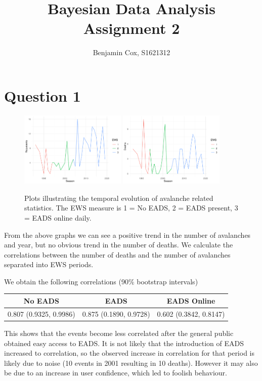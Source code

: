 \documentclass[10pt]{extarticle}
\begin{document}
	
\title{Bayesian Data Analysis Assignment 2}
\author{Benjamin Cox, S1621312}
\date{\vspace{-5ex}}
\maketitle

\section*{Question 1}

\begin{figure}[H]
	\includegraphics[width = 0.45\textwidth]{../ava_sea}
	\includegraphics[width = 0.45\textwidth]{../dea_sea}
	\caption{Plots illustrating the temporal evolution of avalanche related statistics. The EWS measure is 1 = No EADS, 2 = EADS present, 3 = EADS online daily.}
	\label{fig:tempevava}
\end{figure}	

	From the above graphs we can see a positive trend in the number of avalanches and year, but no obvious trend in the number of deaths. We calculate the correlations between the number of deaths and the number of avalanches separated into EWS periods. 
	
	We obtain the following correlations (90\% bootstrap intervals)
\begin{table}[H]
	\centering
	\begin{tabular}{ccc}
		\hline
		No EADS & EADS & EADS Online \\
		\hline
		0.807 (0.9325, 0.9986) & 0.875 (0.1890, 0.9728) & 0.602 (0.3842, 0.8147) \\
		\hline
	\end{tabular}
\end{table}
This shows that the events become less correlated after the general public obtained easy access to EADS. It is not likely that the introduction of EADS increased to correlation, so the observed increase in correlation for that period is likely due to noise (10 events in 2001 resulting in 10 deaths). However it may also be due to an increase in user confidence, which led to foolish behaviour.
\end{document}
